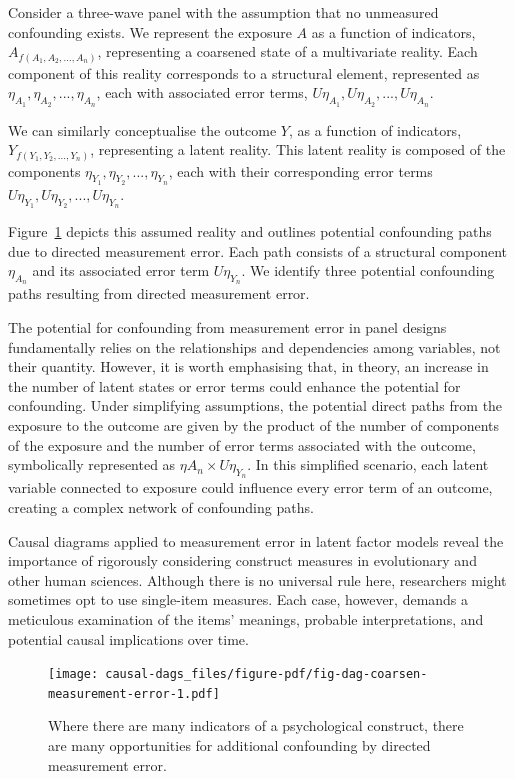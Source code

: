 \documentclass[
  singlecolumn]{article}
\begin{document}
Consider a three-wave panel with the assumption that no unmeasured
confounding exists. We represent the exposure \(A\) as a function of
indicators, \(A_{f(A_1, A_2, ..., A_n)}\), representing a coarsened
state of a multivariate reality. Each component of this reality
corresponds to a structural element, represented as
\(\eta_{A_1}, \eta_{A_2}, ..., \eta_{A_n}\), each with associated error
terms, \(U\eta_{A_1}, U\eta_{A_2}, ..., U\eta_{A_n}\).

We can similarly conceptualise the outcome \(Y\), as a function of
indicators, \(Y_{f(Y_1, Y_2, ..., Y_n)}\), representing a latent
reality. This latent reality is composed of the components
\(\eta_{Y_1}, \eta_{Y_2}, ..., \eta_{Y_n}\), each with their
corresponding error terms
\(U\eta_{Y_1}, U\eta_{Y_2}, ..., U\eta_{Y_n}\).

Figure~\ref{fig-dag-coarsen-measurement-error} depicts this assumed
reality and outlines potential confounding paths due to directed
measurement error. Each path consists of a structural component
\(\eta_{A_n}\) and its associated error term \(U\eta_{Y_n}\). We
identify three potential confounding paths resulting from directed
measurement error.

The potential for confounding from measurement error in panel designs
fundamentally relies on the relationships and dependencies among
variables, not their quantity. However, it is worth emphasising that, in
theory, an increase in the number of latent states or error terms could
enhance the potential for confounding. Under simplifying assumptions,
the potential direct paths from the exposure to the outcome are given by
the product of the number of components of the exposure and the number
of error terms associated with the outcome, symbolically represented as
\(\eta A_n \times U\eta_{Y_n}\). In this simplified scenario, each
latent variable connected to exposure could influence every error term
of an outcome, creating a complex network of confounding paths.

Causal diagrams applied to measurement error in latent factor models
reveal the importance of rigorously considering construct measures in
evolutionary and other human sciences. Although there is no universal
rule here, researchers might sometimes opt to use single-item measures.
Each case, however, demands a meticulous examination of the items'
meanings, probable interpretations, and potential causal implications
over time.

\begin{figure}

{\centering \texttt{[image: causal-dags\_files/figure-pdf/fig-dag-coarsen-measurement-error-1.pdf]}

}

\caption{\label{fig-dag-coarsen-measurement-error}Where there are many
indicators of a psychological construct, there are many opportunities
for additional confounding by directed measurement error.}

\end{figure}
\end{document}
